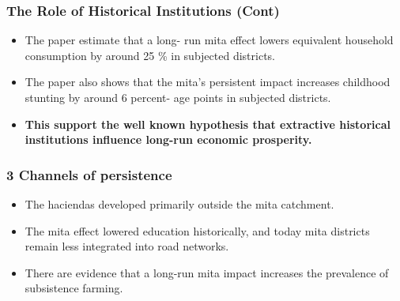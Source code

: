 \begin{frame}
\frametitle{The Role of Historical Institutions (Cont)}
\begin{itemize}

\item The paper estimate that a long- run mita effect lowers equivalent household consumption by around 25 \% in subjected districts.\\[20pt]

\item The paper also shows that the mita’s persistent impact increases childhood stunting by around 6 percent- age points in subjected districts.\\[20pt]

\item  \textbf {This support the well known hypothesis that extractive historical institutions influence long-run economic prosperity.}

\end{itemize}


\end{frame}

\begin{frame}
\frametitle{3 Channels of persistence}
\begin{itemize}

\item The haciendas developed primarily outside the mita catchment.\\[20pt]

\item The mita effect lowered education historically, and today mita districts remain less integrated into road networks.\\[20pt]

\item There are evidence that a long-run mita impact increases the prevalence of subsistence farming.\\[20pt]

\end{itemize}


\end{frame}